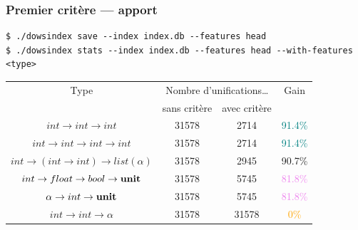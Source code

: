 \documentclass[serif]{beamer}
\begin{document}

\begin{frame}[fragile=singleslide]\frametitle{Premier critère — apport}
\scriptsize
\begin{verbatim}
$ ./dowsindex save --index index.db --features head
$ ./dowsindex stats --index index.db --features head --with-features <type>
\end{verbatim}
\small
\begin{table}[h]
  \centering
  \begin{tabular}{|*{4}{c|}}
    \hline
      Type &
      \multicolumn{2}{c|}{Nombre d'unifications\dots} &
      Gain
    \\
    \cline{2-3}
          &
      sans critère & avec critère &
    \\
    \hline
      $int \rightarrow int \rightarrow int$ &
      31578 & 2714 & \textcolor{teal}{91.4\%}
    \\
      $int \rightarrow int \rightarrow int \rightarrow int$ &
      31578 & 2714 & \textcolor{teal}{91.4\%}
    \\
      $int \rightarrow (int \rightarrow int) \rightarrow list (\alpha)$ &
      31578 & 2945 & 90.7\%
    \\
      $int \rightarrow float \rightarrow bool \rightarrow \bold{unit}$ &
      31578 & 5745 & \textcolor{violet}{81.8\%}
    \\
      $\alpha \rightarrow int \rightarrow \bold{unit}$ &
      31578 & 5745 & \textcolor{violet}{81.8\%}
    \\
      $int \rightarrow int \rightarrow \alpha$ &
      31578 & 31578 & \textcolor{orange}{0\%}
    \\
    \hline
  \end{tabular}
\end{table}
\end{frame}

\end{document}
